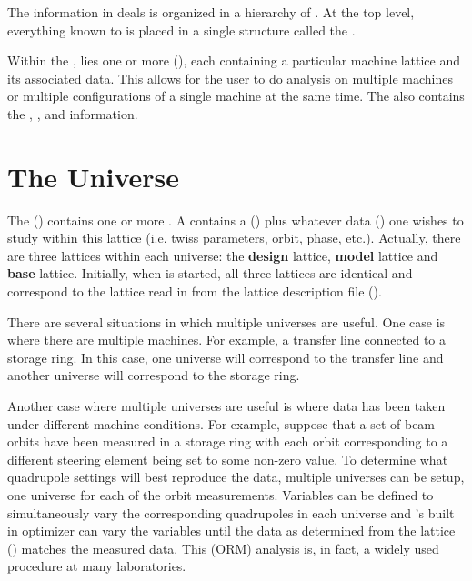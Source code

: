 The information in \tao deals is organized in a hierarchy of
. At the top level, everything known to \tao is
placed in a single structure called the .

Within the , lies one or more 
(), each  containing a particular
machine lattice and its associated data. This allows for the user to
do analysis on multiple machines or multiple configurations of a
single machine at the same time. The  also contains
the , , and  information.

\section{The Universe}
\label{s:universe}

The \tao {} () contains one or
more .  A  contains a 
() plus whatever data () one wishes to
study within this lattice (i.e. twiss parameters, orbit, phase,
etc.). Actually, there are three lattices within each universe: the
\textbf{design} lattice, \textbf{model} lattice and \textbf{base}
lattice. Initially, when \tao is started, all three lattices are
identical and correspond to the lattice read in from the lattice
description file ().

There are several situations in which multiple universes are
useful. One case is where there are multiple machines. For example, a
transfer line connected to a storage ring. In this case, one universe
will correspond to the transfer line and another universe will
correspond to the storage ring. 

Another case where multiple universes are useful is where data has
been taken under different machine conditions. For example, suppose
that a set of beam orbits have been measured in a storage ring with
each orbit corresponding to a different steering element being set to some
non-zero value. To determine what
quadrupole settings will best reproduce the data, multiple universes can be
setup, one universe for each of the orbit measurements. Variables can be
defined to simultaneously vary the corresponding quadrupoles in each
universe and \tao's built in optimizer can vary the variables until
the data as determined from the  lattice ()
matches the measured data. This  (ORM) analysis
is, in fact, a widely used procedure at many laboratories.

